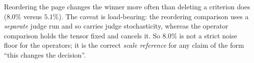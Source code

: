 \begin{remark}
Reordering the page changes the winner more often than deleting a criterion does
($8.0\%$ versus $5.1\%$). The caveat is load-bearing: the reordering comparison
uses a \emph{separate} judge run and so carries judge stochasticity, whereas the
operator comparison holds the tensor fixed and cancels it. So $8.0\%$ is not a
strict noise floor for the operators; it is the correct \emph{scale reference}
for any claim of the form ``this changes the decision''.
\end{remark}
